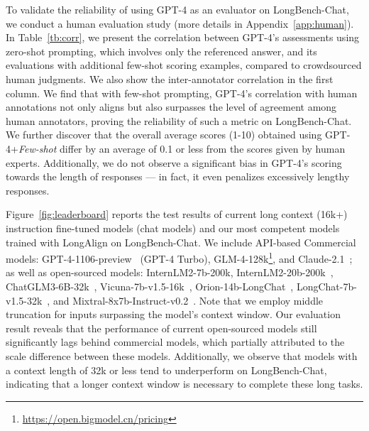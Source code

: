 \begin{table}[t]
\centering
{}
\caption{Inter-annotator correlations; correlations between GPT-4 (w/ and w/o Few-shot) and human.}
\label{tb:corr}
\end{table}

To validate the reliability of using GPT-4 as an evaluator on LongBench-Chat, we conduct a human evaluation study (more details in Appendix~\ref{app:human}). In Table~\ref{tb:corr}, we present the correlation between GPT-4's assessments using zero-shot prompting, which involves only the referenced answer, and its evaluations with additional few-shot scoring examples, compared to crowdsourced human judgments. We also show the inter-annotator correlation in the first column.
We find that with few-shot prompting, GPT-4's correlation with human annotations not only aligns but also surpasses the level of agreement among human annotators, proving the reliability of such a metric on LongBench-Chat.
We further discover that the overall average scores (1-10) obtained using GPT-4+\emph{Few-shot} differ by an average of 0.1 or less from the scores given by human experts. 
Additionally, we do not observe a significant bias in GPT-4's scoring towards the length of responses --- in fact, it even penalizes excessively lengthy responses.

Figure~\ref{fig:leaderboard} reports the test results of current long context (16k+) instruction fine-tuned models (chat models) and our most competent models trained with LongAlign on LongBench-Chat.
We include API-based Commercial models: GPT-4-1106-preview~\cite{gpt-4-1106-preview} (GPT-4 Turbo), GLM-4-128k\footnote{\hyperlink{https://open.bigmodel.cn/pricing}{https://open.bigmodel.cn/pricing}}, and Claude-2.1~\cite{claude}; as well as open-sourced models: InternLM2-7b-200k, InternLM2-20b-200k~\cite{2023internlm}, ChatGLM3-6B-32k~\cite{du2022glm,zeng2022glm}, Vicuna-7b-v1.5-16k~\citep{zheng2023judging}, Orion-14b-LongChat~\cite{orion2024}, LongChat-7b-v1.5-32k~\cite{longchat2023}, and Mixtral-8x7b-Instruct-v0.2~\cite{jiang2024mixtral}.
Note that we employ middle truncation for inputs surpassing the model's context window.
Our evaluation result reveals that the performance of current open-sourced models still significantly lags behind commercial models, which partially attributed to the scale difference between these models. Additionally, we observe that models with a context length of 32k or less tend to underperform on LongBench-Chat, indicating that a longer context window is necessary to complete these long tasks.

